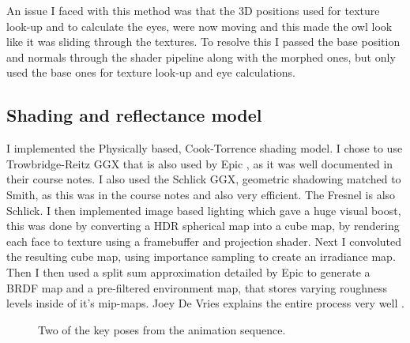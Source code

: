 \documentclass[]{acmsiggraph}
\begin{document}
An issue I faced with this method was that the 3D positions used for texture look-up and to calculate the eyes, were now moving and this made the owl look like it was sliding through the textures. To resolve this I passed the base position and normals through the shader pipeline along with the morphed ones, but only used the base ones for texture look-up and eye calculations.

\subsection{Shading and reflectance model}

I implemented the Physically based, Cook-Torrence shading model. I chose to use Trowbridge-Reitz GGX that is also used by Epic \cite{epicpbr}, as it was well documented in their course notes. I also used the Schlick GGX, geometric shadowing matched to Smith, as this was in the course notes and also very efficient. The Fresnel is also Schlick. I then implemented image based lighting which gave a huge visual boost, this was done by converting a HDR spherical map into a cube map, by rendering each face to texture using a framebuffer and projection shader. Next I convoluted the resulting cube map, using importance sampling to create an irradiance map.
Then I then used a split sum approximation detailed by Epic to generate a BRDF map and a pre-filtered environment map, that stores varying roughness levels inside of it's mip-maps. Joey De Vries explains the entire process very well \cite{specibl}.

\begin{figure}[htbp]
 \centering
 \hfill
 \caption{\label{fig:morph}Two of the key poses from the animation sequence.}
\end{figure}
\end{document}
